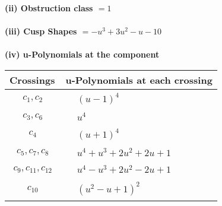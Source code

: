 \documentclass[1p]{elsarticle_modified}
\theoremstyle{definition}
\begin{document}
\flushleft \textbf{(ii) Obstruction class $= 1$}\\~\\
\flushleft \textbf{(iii) Cusp Shapes $= - u^3+3 u^2- u-10$}\\~\\
\newpage\renewcommand{\arraystretch}{1}
\flushleft \textbf{(iv) u-Polynomials at the component}\newline \\
\begin{tabular}{m{50pt}|m{274pt}}
Crossings & \hspace{64pt}u-Polynomials at each crossing \\
\hline $$\begin{aligned}c_{1},c_{2}\end{aligned}$$&$\begin{aligned}
&(u-1)^4
\end{aligned}$\\
\hline $$\begin{aligned}c_{3},c_{6}\end{aligned}$$&$\begin{aligned}
&u^4
\end{aligned}$\\
\hline $$\begin{aligned}c_{4}\end{aligned}$$&$\begin{aligned}
&(u+1)^4
\end{aligned}$\\
\hline $$\begin{aligned}c_{5},c_{7},c_{8}\end{aligned}$$&$\begin{aligned}
&u^4+u^3+2 u^2+2 u+1
\end{aligned}$\\
\hline $$\begin{aligned}c_{9},c_{11},c_{12}\end{aligned}$$&$\begin{aligned}
&u^4- u^3+2 u^2-2 u+1
\end{aligned}$\\
\hline $$\begin{aligned}c_{10}\end{aligned}$$&$\begin{aligned}
&(u^2- u+1)^2
\end{aligned}$\\
\hline
\end{tabular}\\~\\
\end{document}
